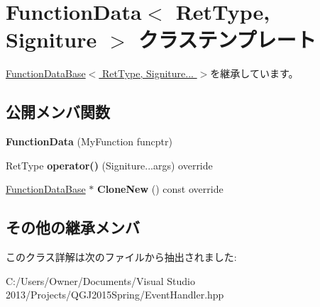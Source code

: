 \hypertarget{class_function_data}{}\section{Function\+Data$<$ Ret\+Type, Signiture $>$ クラステンプレート}
\label{class_function_data}


\hyperlink{class_function_data_base}{Function\+Data\+Base$<$ Ret\+Type, Signiture... $>$}を継承しています。

\subsection*{公開メンバ関数}
\begin{DoxyCompactItemize}
\item 
{\bfseries Function\+Data} (My\+Function funcptr)\hypertarget{class_function_data_a403eb38c7b2e6122e495e96c96c4176b}{}\label{class_function_data_a403eb38c7b2e6122e495e96c96c4176b}

\item 
Ret\+Type {\bfseries operator()} (Signiture...\+args) override\hypertarget{class_function_data_a4f583a612b451717c707eddda5c908a6}{}\label{class_function_data_a4f583a612b451717c707eddda5c908a6}

\item 
\hyperlink{class_function_data_base}{Function\+Data\+Base} $\ast$ {\bfseries Clone\+New} () const  override\hypertarget{class_function_data_af61c9ecedf5fde562e78f1442fd963db}{}\label{class_function_data_af61c9ecedf5fde562e78f1442fd963db}

\end{DoxyCompactItemize}
\subsection*{その他の継承メンバ}


このクラス詳解は次のファイルから抽出されました\+:\begin{DoxyCompactItemize}
\item 
C\+:/\+Users/\+Owner/\+Documents/\+Visual Studio 2013/\+Projects/\+Q\+G\+J2015\+Spring/Event\+Handler.\+hpp\end{DoxyCompactItemize}
